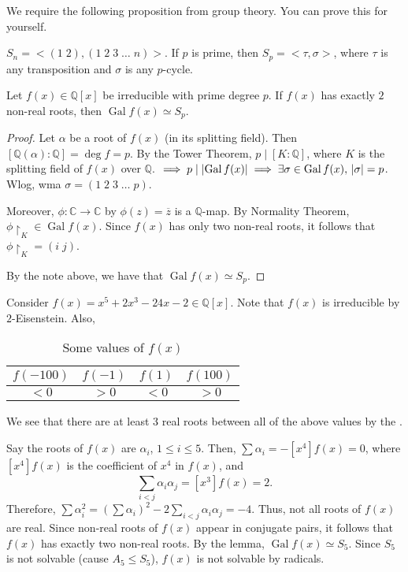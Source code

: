 \documentclass[notoc,notitlepage,nobib]{tufte-book}
\DeclareMathOperator{\Gal}{Gal}
\begin{document}
We require the following proposition from group theory. You can prove this
for yourself.

\begin{note}
  $S_n = <(1 \; 2), (1 \; 2 \; 3 \; \hdots \; n)>$. If $p$ is prime, then $S_p =
  <\tau, \sigma>$, where $\tau$ is any transposition and $\sigma$ is any
  $p$-cycle.
\end{note}

\begin{lemma}
  Let $f(x) \in \mathbb{Q}[x]$ be irreducible with prime degree $p$. If $f(x)$ 
  has exactly $2$ non-real roots, then $\Gal f(x) \simeq S_p$.
\end{lemma}

\begin{proof}
  Let $\alpha$ be a root of $f(x)$ (in its splitting field). Then $[
  \mathbb{Q}(\alpha) : \mathbb{Q} ] = \deg f = p$. By the Tower Theorem, $p \mid
  [ K : \mathbb{Q} ]$, where $K$ is the splitting field of $f(x)$ over
  $\mathbb{Q}$. $\implies p \mid \abs{\Gal f(x)} \implies \exists \sigma \in
  \Gal f(x), \, \abs{\sigma} = p$. Wlog, wma $\sigma = (1 \; 2 \; 3 \; \hdots \;
  p)$.
  
  Moreover, $\phi : \mathbb{C} \to \mathbb{C}$ by $\phi(z) = \overline{z}$ is a
  $\mathbb{Q}$-map. By Normality Theorem, $\phi \restriction_{K} \in \Gal
  f(x)$. Since $f(x)$ has only two non-real roots, it follows that $\phi
  \restriction_{K} = (i \; j)$.

  By the note above, we have that $\Gal f(x) \simeq S_p$.
\end{proof}

\begin{eg}
  Consider $f(x) = x^5 + 2x^3 - 24x - 2 \in \mathbb{Q}[x]$. Note that $f(x)$ is
  irreducible by $2$-Eisenstein. Also, 
  \begin{table}[ht]
    \centering
    \caption{Some values of $f(x)$}
    \label{table:some_values_of_f_x}
    \begin{tabular}{c c c c}
      $f(-100)$ & $f(-1)$ & $f(1)$ & $f(100)$ \\
      \hline
      $< 0$     & $> 0$   & $< 0$  & $> 0$
    \end{tabular}
  \end{table}

  We see that there are at least 3 real roots between all of the above values by
  the .

  Say the roots of $f(x)$ are $\alpha_i$, $1 \leq i \leq 5$. Then, $\sum
  \alpha_i = - [x^4] f(x) = 0$, where $[x^4] f(x)$ is the coefficient of $x^4$ 
  in $f(x)$, and
  \begin{equation*}
    \sum_{i < j} \alpha_i \alpha_j = [x^3] f(x) = 2. 
  \end{equation*}
  Therefore, $\sum \alpha_i^2 = \left( \sum \alpha_i \right)^2 - 2 \sum_{i < j} \alpha_i
  \alpha_j = -4$. Thus, not all roots of $f(x)$ are real. Since non-real roots
  of $f(x)$ appear in conjugate pairs, it follows that $f(x)$ has exactly two
  non-real roots. By the lemma, $\Gal f(x) \simeq S_5$. Since $S_5$ is not
  solvable (cause $A_5 \leq S_5$), $f(x)$ is not solvable by radicals.
\end{eg}
\end{document}
